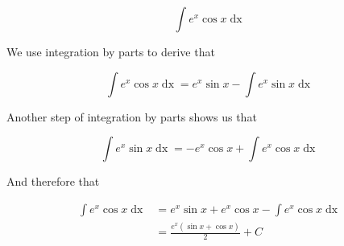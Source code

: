\documentclass[a4paper, titlepage]{article}
\begin{document}
\begin{Exercise}
\[\int e^x \cos x \mathop{dx}\]
\end{Exercise}

\begin{Answer}

We use integration by parts to derive that

\[\int e^x \cos x \mathop{dx}
  = e^x \sin x - \int e^x \sin x \mathop{dx}\]

Another step of integration by parts shows us that

    \[\int e^x \sin x \mathop{dx} = - e^x \cos x + \int e^x \cos x \mathop{dx}\]

And therefore that

\begin{align*}
\int e^x \cos x \mathop{dx} &= e^x \sin x + e^x \cos x - \int e^x \cos x \mathop{dx} \\
 &= \frac{e^x \left(\sin x + \cos x \right)}{2} + C
\end{align*}
\end{Answer}

\printbibliography
\end{document}
